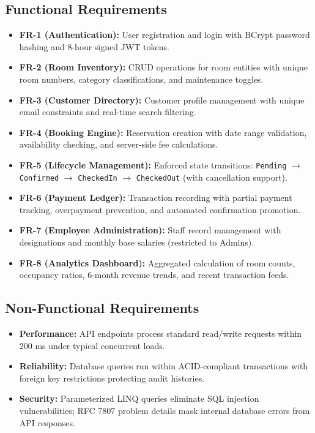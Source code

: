 \documentclass[11pt,a4paper]{article}
\begin{document}
\subsection{Functional Requirements}
\begin{itemize}[leftmargin=*]
  \item \textbf{FR-1 (Authentication):} User registration and login with BCrypt password hashing and 8-hour signed JWT tokens.
  \item \textbf{FR-2 (Room Inventory):} CRUD operations for room entities with unique room numbers, category classifications, and maintenance toggles.
  \item \textbf{FR-3 (Customer Directory):} Customer profile management with unique email constraints and real-time search filtering.
  \item \textbf{FR-4 (Booking Engine):} Reservation creation with date range validation, availability checking, and server-side fee calculations.
  \item \textbf{FR-5 (Lifecycle Management):} Enforced state transitions: \texttt{Pending} $\rightarrow$ \texttt{Confirmed} $\rightarrow$ \texttt{CheckedIn} $\rightarrow$ \texttt{CheckedOut} (with cancellation support).
  \item \textbf{FR-6 (Payment Ledger):} Transaction recording with partial payment tracking, overpayment prevention, and automated confirmation promotion.
  \item \textbf{FR-7 (Employee Administration):} Staff record management with designations and monthly base salaries (restricted to Admins).
  \item \textbf{FR-8 (Analytics Dashboard):} Aggregated calculation of room counts, occupancy ratios, 6-month revenue trends, and recent transaction feeds.
\end{itemize}

\subsection{Non-Functional Requirements}
\begin{itemize}[leftmargin=*]
  \item \textbf{Performance:} API endpoints process standard read/write requests within 200 ms under typical concurrent loads.
  \item \textbf{Reliability:} Database queries run within ACID-compliant transactions with foreign key restrictions protecting audit histories.
  \item \textbf{Security:} Parameterized LINQ queries eliminate SQL injection vulnerabilities; RFC 7807 problem details mask internal database errors from API responses.
\end{itemize}
\end{document}
